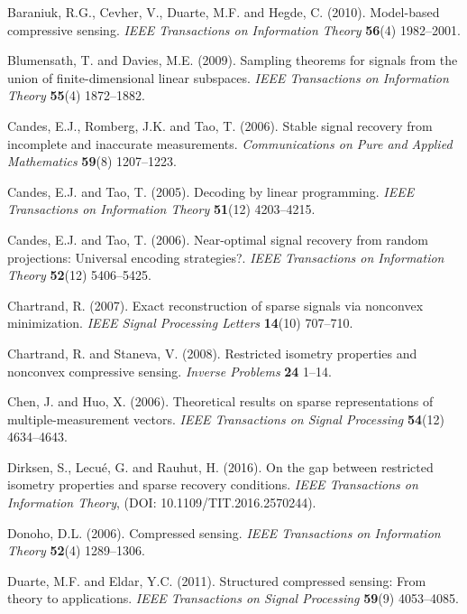 \documentclass[11pt]{article}
\begin{document}
\begin{thebibliography}{}\setlength{\itemsep}{-0.5mm}
	Baraniuk, R.G., Cevher, V., Duarte, M.F. and Hegde, C. (2010).
	Model-based compressive sensing. \textit{IEEE Transactions on Information Theory}
	\textbf{56}(4) 1982--2001.
	
	Blumensath, T. and Davies, M.E. (2009). Sampling theorems for signals from the union of finite-dimensional linear subspaces. \textit{IEEE Transactions on Information Theory}
	\textbf{55}(4) 1872--1882.
	
	Candes, E.J., Romberg, J.K. and Tao, T. (2006). Stable signal recovery from incomplete and inaccurate measurements. \textit{Communications on Pure and Applied Mathematics}
	\textbf{59}(8) 1207--1223.
	
	Candes, E.J. and Tao, T. (2005). Decoding by linear programming. \textit{IEEE Transactions on Information Theory}  \textbf{51}(12) 4203--4215.
	
	Candes, E.J. and Tao, T. (2006). Near-optimal signal recovery from random projections: Universal encoding strategies?. \textit{IEEE Transactions on Information Theory}
	\textbf{52}(12) 5406--5425.
	
	Chartrand, R. (2007). Exact reconstruction of sparse signals via nonconvex minimization. \textit{IEEE Signal Processing Letters}
	\textbf{14}(10) 707--710.
	
	Chartrand, R. and Staneva, V. (2008). Restricted isometry properties and nonconvex compressive sensing. \textit{Inverse Problems}
	\textbf{24} 1--14.
	
	Chen, J. and Huo, X. (2006). Theoretical results on sparse representations of multiple-measurement vectors. \textit{IEEE Transactions on Signal Processing} \textbf{54}(12) 4634--4643.
	
	Dirksen, S., Lecu\'{e}, G. and Rauhut, H. (2016). On the gap between restricted isometry properties and sparse recovery conditions. \textit{IEEE Transactions on Information Theory},  (DOI: 10.1109/TIT.2016.2570244).
	
	Donoho, D.L. (2006). Compressed sensing. \textit{IEEE Transactions on Information Theory}
	\textbf{52}(4) 1289--1306.
	
	Duarte, M.F. and Eldar, Y.C. (2011). Structured compressed sensing: From theory to applications. \textit{IEEE Transactions on Signal Processing}
	\textbf{59}(9) 4053--4085.
	

\end{thebibliography}
\end{document}
